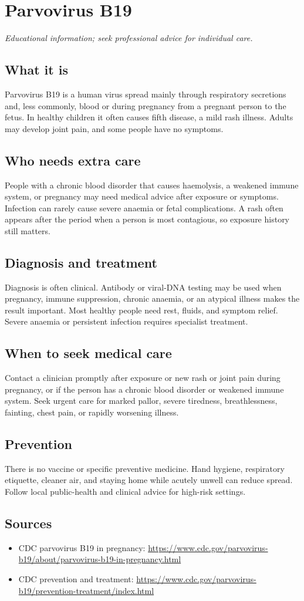 \chapter{Parvovirus B19}

\medskip
\noindent\textit{Educational information; seek professional advice for individual care.}

\section*{What it is}
Parvovirus B19 is a human virus spread mainly through respiratory secretions and, less commonly, blood or during pregnancy from a pregnant person to the fetus. In healthy children it often causes fifth disease, a mild rash illness. Adults may develop joint pain, and some people have no symptoms.

\section*{Who needs extra care}
People with a chronic blood disorder that causes haemolysis, a weakened immune system, or pregnancy may need medical advice after exposure or symptoms. Infection can rarely cause severe anaemia or fetal complications. A rash often appears after the period when a person is most contagious, so exposure history still matters.

\section*{Diagnosis and treatment}
Diagnosis is often clinical. Antibody or viral-DNA testing may be used when pregnancy, immune suppression, chronic anaemia, or an atypical illness makes the result important. Most healthy people need rest, fluids, and symptom relief. Severe anaemia or persistent infection requires specialist treatment.

\section*{When to seek medical care}
Contact a clinician promptly after exposure or new rash or joint pain during pregnancy, or if the person has a chronic blood disorder or weakened immune system. Seek urgent care for marked pallor, severe tiredness, breathlessness, fainting, chest pain, or rapidly worsening illness.

\section*{Prevention}
There is no vaccine or specific preventive medicine. Hand hygiene, respiratory etiquette, cleaner air, and staying home while acutely unwell can reduce spread. Follow local public-health and clinical advice for high-risk settings.

\section*{Sources}
\begin{itemize}
\item CDC parvovirus B19 in pregnancy: \url{https://www.cdc.gov/parvovirus-b19/about/parvovirus-b19-in-pregnancy.html}
\item CDC prevention and treatment: \url{https://www.cdc.gov/parvovirus-b19/prevention-treatment/index.html}
\end{itemize}
